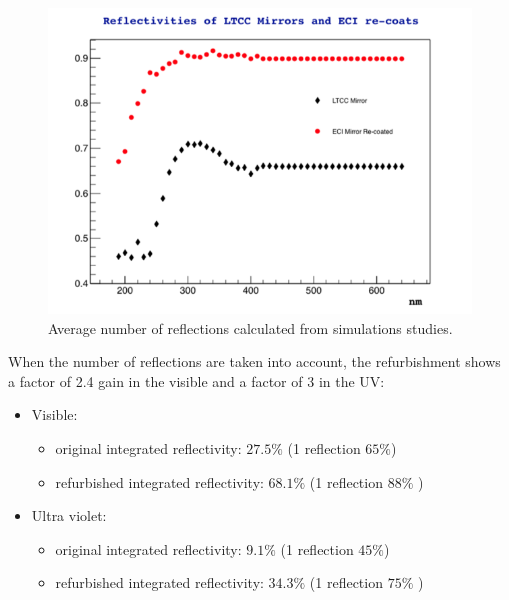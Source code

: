 \begin{figure}[hbt]
	\centering
	\includegraphics[width=1.0\columnwidth,keepaspectratio]{img/reflectivityGain.png}
	\caption{Average number of reflections calculated from simulations studies.}
	\label{fig:reflectivityGain}
\end{figure}

When the number of reflections are taken into account, the refurbishment shows
a factor of 2.4 gain in the visible and a factor of 3 in the UV:

\begin{itemize}
	\item Visible:
	\begin{itemize}
		\item original integrated reflectivity: $27.5\%$ (1 reflection $65\%$)
		\item refurbished integrated reflectivity: $68.1\%$  (1 reflection $88\%$ )
	\end{itemize}
	\item Ultra violet:
	\begin{itemize}
		\item original integrated reflectivity: $9.1\%$ (1 reflection $45\%$)
		\item refurbished integrated reflectivity: $34.3\%$  (1 reflection $75\%$ )
	\end{itemize}
\end{itemize}


